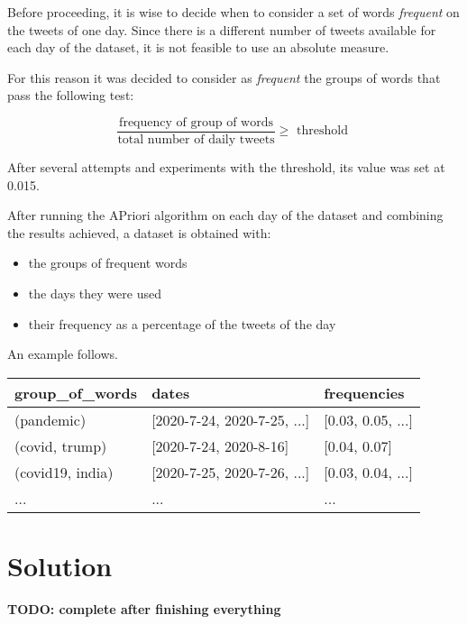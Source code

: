 Before proceeding, it is wise to decide when to consider a set of words \textit{frequent} on the tweets of one day. Since there is a different number of tweets available for each day of the dataset, it is not feasible to use an absolute measure.

For this reason it was decided to consider as \textit{frequent} the groups of words that pass the following test:

$$
  \frac{ \text{frequency of group of words} }{ \text{total number of daily tweets} } \ge \text{ threshold }
$$

After several attempts and experiments with the threshold, its value was set at 0.015.

After running the APriori algorithm on each day of the dataset and combining the results achieved, a dataset is obtained with:
\begin{itemize}
  \item the groups of frequent words
  \item the days they were used
  \item their frequency as a percentage of the tweets of the day
\end{itemize}

An example follows.

\begin{table}[h]
  \centering
  \begin{tabular}{@{}lll@{}}
  \toprule
  \textbf{group\_of\_words} & \textbf{dates}                   & \textbf{frequencies}    \\ \midrule
  (pandemic)            & {[}2020-7-24, 2020-7-25, ...{]}       & {[}0.03, 0.05, ...{]}       \\
  (covid, trump)            & {[}2020-7-24, 2020-8-16{]}       & {[}0.04, 0.07{]}       \\
  (covid19, india)          & {[}2020-7-25, 2020-7-26, ...{]}  & {[}0.03, 0.04, ...{]}  \\
  ...                       & ...                              & ...                    \\ \bottomrule
  \end{tabular}
  \end{table}


\section{Solution}

\begin{center}
  \textbf{TODO: complete after finishing everything}
\end{center}

